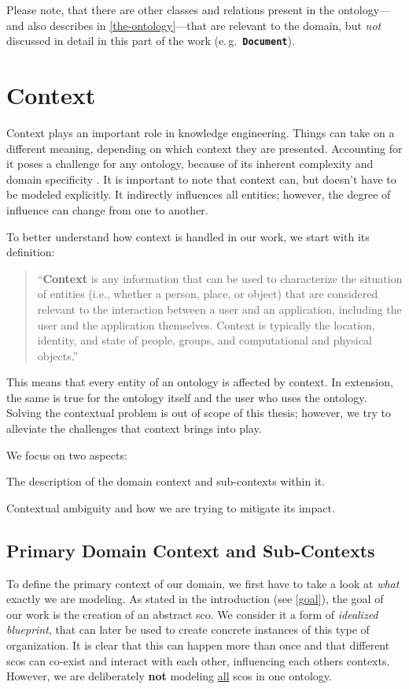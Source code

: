 \documentclass[a4paper, DIV=13, BCOR=0cm]{scrbook}
\newcommand{\eg}{e.\,g.\ }
\newcommand{\class}[1]{\texttt{\textbf{#1}}}
\begin{document}
Please note, that there are other classes and relations present in the ontology---and also describes in \autoref{the-ontology}---that are relevant to the domain, but \textit{not} discussed in detail in this part of the work (\eg \class{Document}).

\section{Context }
\label{context}
Context plays an important role in knowledge engineering. Things can take on a different meaning, depending on which context they are presented. Accounting for it poses a challenge for any ontology, because of its inherent complexity and domain specificity \cite[p.\,1]{moore2012intelligent}. It is important to note that context can, but doesn't have to be modeled explicitly. It indirectly influences all entities; however, the degree of influence can change from one to another.

To better understand how context is handled in our work, we start with its definition:
\begin{quote}
	\enquote{\textbf{Context} is any information that can be used to characterize the situation of entities (i.e., whether a person, place, or object) that are considered relevant to the interaction between a user and an application, including the user and the application themselves. Context is typically the location, identity, and state of people, groups, and computational and physical objects.} \cite[p.\,106]{dey2001conceptual}
\end{quote}

This means that every entity of an ontology is affected by context. In extension, the same is true for the ontology itself and the user who uses the ontology. Solving the contextual problem is out of scope of this thesis; however, we try to alleviate the challenges that context brings into play.

We focus on two aspects:
\begin{inparaenum}
	\item The description of the domain context and sub-contexts within it.
	\item Contextual ambiguity and how we are trying to mitigate its impact.
\end{inparaenum}

\subsection{Primary Domain Context and Sub-Contexts}
To define the primary context of our domain, we first have to take a look at \textit{what} exactly we are modeling. As stated in the introduction (see \autoref{goal}), the goal of our work is the creation of an abstract \gls{sco}. We consider it a form of \textit{idealized blueprint}, that can later be used to create concrete instances of this type of organization. It is clear that this can happen more than once and that different \glspl{sco} can co-exist and interact with each other, influencing each others contexts. However, we are deliberately \textbf{not} modeling \underline{all} \glspl{sco} in one ontology.
\end{document}
